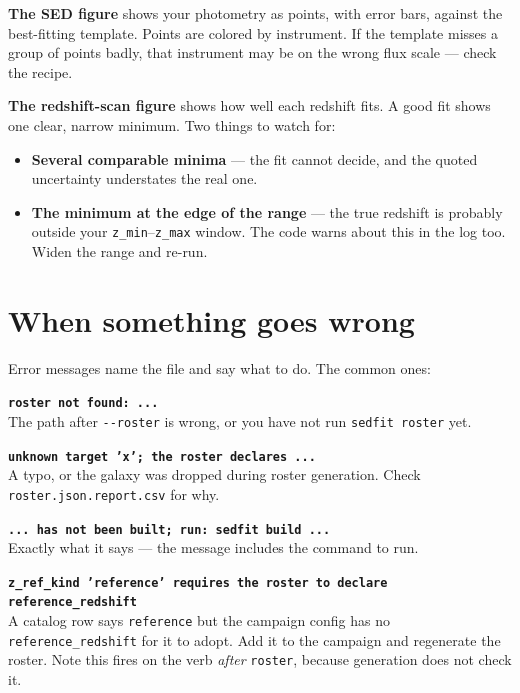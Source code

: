\documentclass[11pt]{article}
\begin{document}
\textbf{The SED figure} shows your photometry as points, with error bars,
against the best-fitting template. Points are colored by instrument. If
the template misses a group of points badly, that instrument may be on
the wrong flux scale --- check the recipe.

\textbf{The redshift-scan figure} shows how well each redshift fits. A
good fit shows one clear, narrow minimum. Two things to watch for:

\begin{itemize}
  \item \textbf{Several comparable minima} --- the fit cannot decide, and
        the quoted uncertainty understates the real one.
  \item \textbf{The minimum at the edge of the range} --- the true
        redshift is probably outside your \texttt{z\_min}--\texttt{z\_max}
        window. The code warns about this in the log too. Widen the range
        and re-run.
\end{itemize}

\section{When something goes wrong}

Error messages name the file and say what to do. The common ones:

\vspace{4pt}
\noindent\textbf{\texttt{roster not found: ...}}\\
The path after \texttt{-{}-roster} is wrong, or you have not run
\texttt{sedfit roster} yet.

\vspace{6pt}
\noindent\textbf{\texttt{unknown target 'x'; the roster declares ...}}\\
A typo, or the galaxy was dropped during roster generation. Check
\texttt{roster.json.report.csv} for why.

\vspace{6pt}
\noindent\textbf{\texttt{... has not been built; run: sedfit build ...}}\\
Exactly what it says --- the message includes the command to run.

\vspace{6pt}
\noindent\textbf{\texttt{z\_ref\_kind 'reference' requires the roster to
declare reference\_redshift}}\\
A catalog row says \texttt{reference} but the campaign config has no
\texttt{reference\_redshift} for it to adopt. Add it to the campaign and
regenerate the roster. Note this fires on the verb \emph{after}
\texttt{roster}, because generation does not check it.
\end{document}
